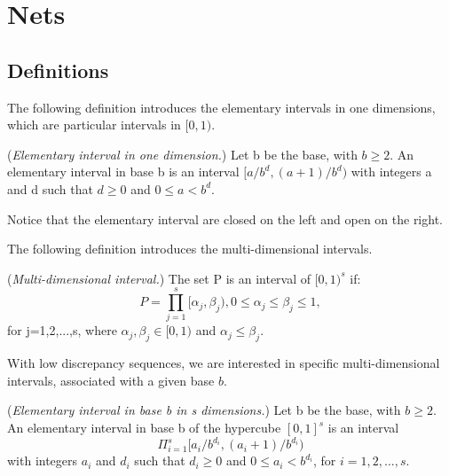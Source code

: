 %

    \chapter{Nets}


\section{Definitions}

The following definition introduces the elementary intervals in one dimensions, 
which are particular intervals in $[0,1)$.

\label{sec-tmsnets-definitions}
\begin{definition}
(\emph{Elementary interval in one dimension.})
Let b be the base, with $b\geq 2$. 
An elementary interval in base b is an interval $[a/b^d,(a+1)/b^d)$
with integers a and d such that $d\geq 0$ and $0\leq a < b^d$.
\end{definition}

Notice that the elementary interval are closed on the left and 
open on the right.

The following definition introduces the multi-dimensional intervals. 

\begin{definition}
(\emph{Multi-dimensional interval.})
The set P is an interval of $[0,1)^s$
if:
$$
P = \prod_{j=1}^s [\alpha_j,\beta_j), 0\leq \alpha_j\leq \beta_j\leq 1,
$$  
for j=1,2,...,s, where $\alpha_j,\beta_j\in[0,1)$ and 
$\alpha_j\leq \beta_j$.
\end{definition}

With low discrepancy sequences, we are interested in specific multi-dimensional intervals, associated 
with a given base $b$.

\begin{definition}
(\emph{Elementary interval in base b in s dimensions.})
Let b be the base, with $b\geq 2$.
An elementary interval in base b of the hypercube $[0,1]^s$ is an interval
$$
\Pi_{i=1}^s [a_i/b^{d_i},(a_i+1)/b^{d_i})
$$
with integers $a_i$ and $d_i$ such that $d_i\geq 0$ and $0\leq a_i < b^{d_i}$,
for $i=1,2,...,s$.
\end{definition}

